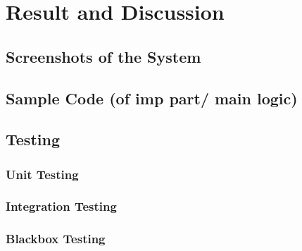 

\chapter{Result and Discussion} \label{chap5}
\newpage

\section{Screenshots of the System}

\section{Sample Code (of imp part/ main logic)}

\section{Testing}
\subsection{Unit Testing}
\subsection{Integration Testing}
\subsection{Blackbox Testing}